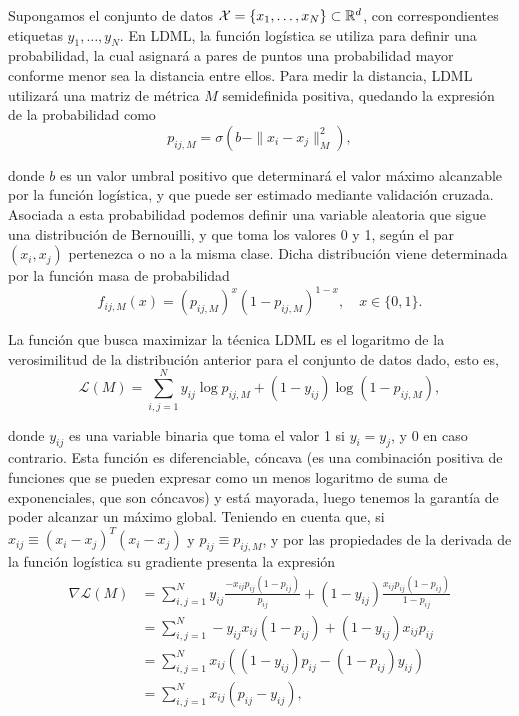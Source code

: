 \documentclass{book}
\begin{document}
Supongamos el conjunto de datos $\mathcal{X} = \{x_1,\dots,x_N\} \subset \mathbb{R}^d$, con correspondientes etiquetas $y_1,\dots,y_N$. En LDML, la función logística se utiliza para definir una probabilidad, la cual asignará a pares de puntos una probabilidad mayor conforme menor sea la distancia entre ellos. Para medir la distancia, LDML utilizará una matriz de métrica $M$ semidefinida positiva, quedando la expresión de la probabilidad como
\begin{equation}
	p_{ij,M} = \sigma(b - \|x_i-x_j\|_M^2),
\end{equation} 

donde $b$ es un valor umbral positivo que determinará el valor máximo alcanzable por la función logística, y que puede ser estimado mediante validación cruzada. Asociada a esta probabilidad podemos definir una variable aleatoria que sigue una distribución de Bernouilli, y que toma los valores 0 y 1, según el par $(x_i,x_j)$ pertenezca o no a la misma clase. Dicha distribución viene determinada por la función masa de probabilidad
\[ f_{ij,M}(x) = (p_{ij,M})^{x}(1-p_{ij,M})^{1-x}, \quad x  \in \{0,1\}. \]

La función que busca maximizar la técnica LDML es el logaritmo de la verosimilitud de la distribución anterior para el conjunto de datos dado, esto es,
\begin{equation}
	\mathcal{L}(M) = \sum_{i,j=1}^N y_{ij}\log p_{ij,M} + (1-y_{ij})\log(1-p_{ij,M}),
\end{equation}

donde $y_{ij}$ es una variable binaria que toma el valor 1 si $y_i = y_j$, y 0 en caso contrario. Esta función es diferenciable, cóncava (es una combinación positiva de funciones que se pueden expresar como un menos logaritmo de suma de exponenciales, que son cóncavos) y está mayorada, luego tenemos la garantía de poder alcanzar un máximo global. Teniendo en cuenta que, si $x_{ij} \equiv (x_i-x_j)^T(x_i-x_j)$ y $p_{ij} \equiv p_{ij,M}$, y por las propiedades de la derivada de la función logística su gradiente presenta la expresión
\begin{align*}
	\mathcal{\nabla L}(M) &= \sum_{i,j=1}^N y_{ij}\frac{-x_{ij} p_{ij}(1 - p_{ij})}{p_{ij}} + (1-y_{ij})\frac{x_{ij}p_{ij}(1-p_{ij})}{1-p_{ij}} \\
						  &= \sum_{i,j=1}^N -y_{ij}x_{ij}(1 - p_{ij}) + (1-y_{ij})x_{ij}p_{ij} \\
						  &= \sum_{i,j=1}^N x_{ij}((1-y_{ij})p_{ij}-(1-p_{ij})y_{ij}) \\
						  &= \sum_{i,j=1}^N x_{ij}(p_{ij}-y_{ij}),
\end{align*}
\end{document}
